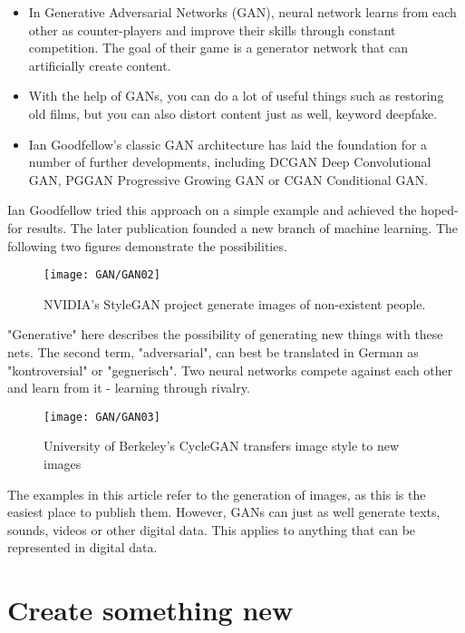 \begin{itemize}
	\item In Generative Adversarial Networks (GAN), neural network learns from each other as counter-players and improve their skills through constant competition. The goal of their game is a generator network that can artificially create content.
	\item With the help of GANs, you can do a lot of useful things such as restoring old films, but you can also distort content just as well, keyword deepfake.
	\item Ian Goodfellow's classic GAN architecture has laid the foundation for a number of further developments, including DCGAN Deep Convolutional GAN, PGGAN Progressive Growing GAN or CGAN Conditional GAN.
\end{itemize}

Ian Goodfellow tried this approach on a simple example and achieved the hoped-for results. The later publication  founded a new branch of machine learning. The following two figures demonstrate the possibilities.


\begin{figure}
	\texttt{[image: GAN/GAN02]}
	\caption{NVIDIA's StyleGAN project generate images of non-existent people.} 
	\label{GAN02}
\end{figure}


"Generative" here describes the possibility of generating new things with these nets. The second term, "adversarial", can best be translated in German as "kontroversial" or "gegnerisch". Two neural networks compete against each other and learn from it - learning through rivalry.

\begin{figure}
	\texttt{[image: GAN/GAN03]}
	\caption{University of Berkeley's CycleGAN transfers image style to new images} 
	\label{GAN03}
\end{figure}


The examples in this article refer to the generation of images, as this is the easiest place to publish them. However, GANs can just as well generate texts, sounds, videos or other digital data. This applies to anything that can be represented in digital data.

\section{Create something new}

